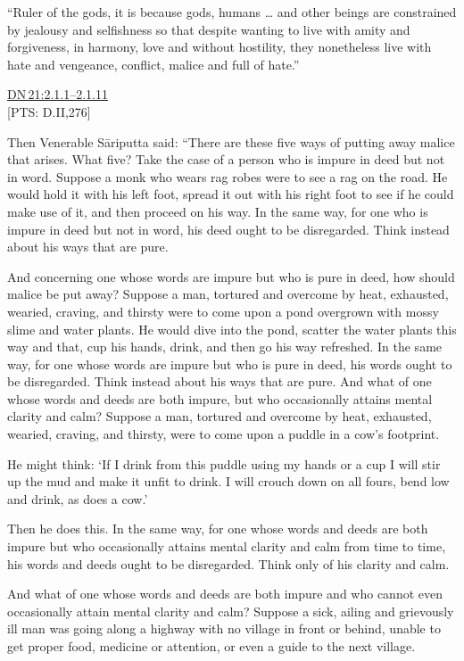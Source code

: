 \documentclass[10pt, openright]{book}
\begin{document}
“Ruler of the gods, it is because gods, humans … and other beings are constrained by jealousy and selfishness so that despite wanting to live with amity and forgiveness, in harmony, love and without hostility, they nonetheless live with hate and vengeance, conflict, malice and full of hate.”


\begin{flushright}
\href{https://suttacentral.net/dn21/en/sujato\#2.1.1}{DN 21:2.1.1–2.1.11}\\

[PTS: D.II,276]


\end{flushright}
Then Venerable Sāriputta said: “There are these five ways of putting away malice that arises. What five? Take the case of a person who is impure in deed but not in word. Suppose a monk who wears rag robes were to see a rag on the road. He would hold it with his left foot, spread it out with his right foot to see if he could make use of it, and then proceed on his way. In the same way, for one who is impure in deed but not in word, his deed ought to be disregarded. Think instead about his ways that are pure.


And concerning one whose words are impure but who is pure in deed, how should malice be put away? Suppose a man, tortured and overcome by heat, exhausted, wearied, craving, and thirsty were to come upon a pond overgrown with mossy slime and water plants. He would dive into the pond, scatter the water plants this way and that, cup his hands, drink, and then go his way refreshed. In the same way, for one whose words are impure but who is pure in deed, his words ought to be disregarded. Think instead about his ways that are pure. And what of one whose words and deeds are both impure, but who occasionally attains mental clarity and calm? Suppose a man, tortured and overcome by heat, exhausted, wearied, craving, and thirsty, were to come upon a puddle in a cow’s footprint.


He might think: ‘If I drink from this puddle using my hands or a cup I will stir up the mud and make it unfit to drink. I will crouch down on all fours, bend low and drink, as does a cow.’


Then he does this. In the same way, for one whose words and deeds are both impure but who occasionally attains mental clarity and calm from time to time, his words and deeds ought to be disregarded. Think only of his clarity and calm.


And what of one whose words and deeds are both impure and who cannot even occasionally attain mental clarity and calm? Suppose a sick, ailing and grievously ill man was going along a highway with no village in front or behind, unable to get proper food, medicine or attention, or even a guide to the next village.
\end{document}
